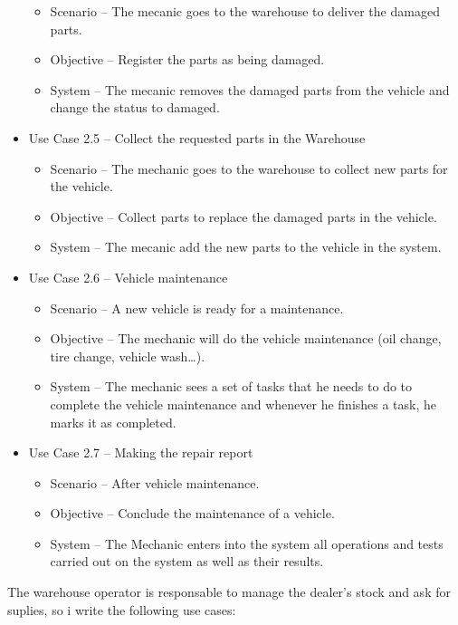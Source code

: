 \begin{itemize}
\begin{itemize}
      \item Scenario – The mecanic goes to the warehouse to deliver the damaged parts.
      \item Objective – Register the parts as being damaged.
      \item System – The mecanic removes the damaged parts from the vehicle and change the status to damaged.
    \end{itemize}
  \item Use Case 2.5 – Collect the requested parts in the Warehouse
  \begin{itemize}
    \item Scenario – The mechanic goes to the warehouse to collect new parts for the vehicle.
    \item Objective – Collect parts to replace the damaged parts in the vehicle.
    \item System – The mecanic add the new parts to the vehicle in the system.
  \end{itemize}
\item Use Case 2.6 – Vehicle maintenance
\begin{itemize}
  \item Scenario – A new vehicle is ready for a maintenance.
  \item Objective – The mechanic will do the vehicle maintenance (oil change, tire change, vehicle wash…).
  \item System – The mechanic sees a set of tasks that he needs to do to complete the vehicle maintenance and whenever he finishes a task, he marks it as completed.
\end{itemize}
\item Use Case 2.7 – Making the repair report
\begin{itemize}
  \item Scenario – After vehicle maintenance.
  \item Objective – Conclude the maintenance of a vehicle.
  \item System – The Mechanic enters into the system all operations and tests carried out on the system as well as their results.
\end{itemize}
\end{itemize}
\hfill \break

The warehouse operator is responsable to manage the dealer's stock and ask for suplies, so i write the following use cases:

